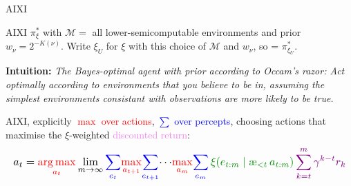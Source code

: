 \documentclass[10pt,aspectratio=169]{beamer}
\newcommand{\cM}{\mathcal{M}}
\DeclareMathOperator*{\argmax}{arg\,max}
\newcommand{\aes}{{\text{\ae}}}            %
\newcommand{\red}[1]{\textcolor{red}{#1}}
\newcommand{\blue}[1]{\textcolor{blue}{#1}}
\newcommand{\green}[1]{\textcolor{green!55!black}{#1}}
\newcommand{\purple}[1]{\textcolor{violet}{#1}}
\begin{document}
\begin{frame}{AIXI}
\begin{block}{AIXI}
$\pi_\xi^*$ with $\cM=$ all lower-semicomputable environments and prior $w_\nu = 2^{-K(\nu)}$.
Write $\xi_U$ for $\xi$ with this choice of $\cM$ and $w_\nu$, so  = $\pi_{\xi_U}^*$.
\end{block}
\textbf{Intuition:} \emph{The Bayes-optimal agent with prior according to Occam's razor: Act optimally according
to environments that you believe to be in, assuming the simplest environments consistant with
observations are more likely to be true.}
\pause
\begin{block}{AIXI, explicitly}
\red{$\max$ over actions}, \blue{$\sum$ over percepts}, choosing actions that maximise the \green{$\xi$-weighted} \purple{discounted return}:
\[
\resizebox{\linewidth}{!}{$\displaystyle
    a_t = \red{\argmax_{a_t}}\lim_{m\to\infty}
        \blue{\sum_{e_t}}\red{\max_{a_{t+1}}}\blue{\sum_{e_{t+1}}}\!\cdots\!
      \red{\max_{a_m}}\blue{\sum_{e_m}} \,
      \green{\xi(e_{t:m}\mid \aes_{<t}\,a_{t:m})} \, 
      \purple{\sum_{k=t}^m 
        \gamma^{k-t} r_k} 
$}
\]
\end{block}
\end{frame}

\end{document}
